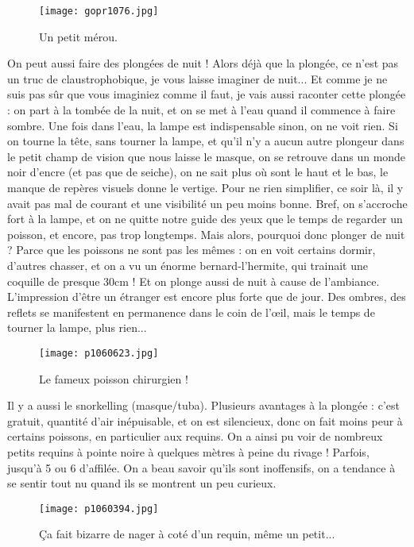 \documentclass{book}
\begin{document}
\begin{figure}[h]
\centering
\texttt{[image: gopr1076.jpg]}
\caption*{Un petit mérou.}
\end{figure}

On peut aussi faire des plongées de nuit ! Alors déjà que la plongée, ce n'est pas un truc de claustrophobique, je vous laisse imaginer de nuit... Et comme je ne suis pas sûr que vous imaginiez comme il faut, je vais aussi raconter cette plongée : on part à la tombée de la nuit, et on se met à l'eau quand il commence à faire sombre. Une fois dans l'eau, la lampe est indispensable sinon, on ne voit rien. Si on tourne la tête, sans tourner la lampe, et qu'il n'y a aucun autre plongeur dans le petit champ de vision que nous laisse le masque, on se retrouve dans un monde noir d'encre (et pas que de seiche), on ne sait plus où sont le haut et le bas, le manque de repères visuels donne le vertige. Pour ne rien simplifier, ce soir là, il y avait pas mal de courant et une visibilité un peu moins bonne. Bref, on s'accroche fort à la lampe, et on ne quitte notre guide des yeux que le temps de regarder un poisson, et encore, pas trop longtemps. Mais alors, pourquoi donc plonger de nuit ? Parce que les poissons ne sont pas les mêmes : on en voit certains dormir, d'autres chasser, et on a vu un énorme bernard-l'hermite, qui trainait une coquille de presque 30cm ! Et on plonge aussi de nuit à cause de l'ambiance. L'impression d'être un étranger est encore plus forte que de jour. Des ombres, des reflets se manifestent en permanence dans le coin de l’œil, mais le temps de tourner la lampe, plus rien...


\begin{figure}[h]
\centering
\texttt{[image: p1060623.jpg]}
\caption*{Le fameux poisson chirurgien !}
\end{figure}

Il y a aussi le snorkelling (masque/tuba). Plusieurs avantages à la plongée : c'est gratuit, quantité d'air inépuisable, et on est silencieux, donc on fait moins peur à certains poissons, en particulier aux requins. On a ainsi pu voir de nombreux petits requins à pointe noire à quelques mètres à peine du rivage ! Parfois, jusqu'à 5 ou 6 d'affilée. On a beau savoir qu'ils sont inoffensifs, on a tendance à se sentir tout nu quand ils se montrent un peu curieux.


\begin{figure}[h]
\centering
\texttt{[image: p1060394.jpg]}
\caption*{Ça fait bizarre de nager à coté d'un requin, même un petit...}
\end{figure}
\end{document}
